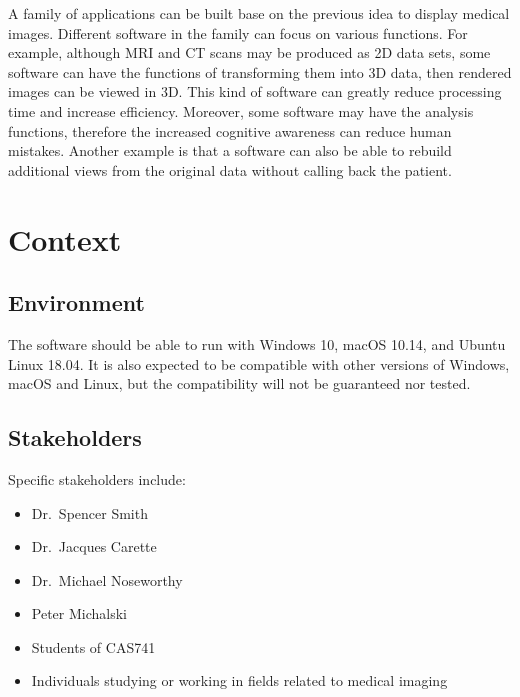 \documentclass{article}
\begin{document}
\medskip
 A family of applications can be built base on the previous idea to display medical images. Different software in the family can focus on various functions. For example, although MRI and CT scans may be produced as 2D data sets, some software can have the functions of transforming them into 3D data, then rendered images can be viewed in 3D. This kind of software can greatly reduce processing time and increase efficiency. Moreover, some software may have the analysis functions, therefore the increased cognitive awareness can reduce human mistakes. Another example is that a software can also be able to rebuild additional views from the original data without calling back the patient.

\section*{Context}
 \subsection*{Environment}
The software should be able to run with Windows 10, macOS 10.14, and Ubuntu Linux 18.04. It is also expected to be compatible with other versions of Windows, macOS and Linux, but the compatibility will not be guaranteed nor tested.

 \subsection*{Stakeholders}
Specific stakeholders include:
\begin{itemize}
\item Dr.\ Spencer Smith
\item Dr.\ Jacques Carette
\item Dr.\ Michael Noseworthy
\item Peter Michalski
\item Students of CAS741 
\item Individuals studying or working in fields related to medical imaging
\end{itemize}
\end{document}
